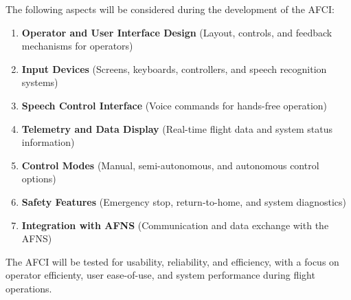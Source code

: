 \documentclass[12pt]{article}
\begin{document}
The following aspects will be considered during the development of the AFCI:
\begin{enumerate}
    \item \textbf{Operator and User Interface Design} (Layout, controls, and feedback mechanisms for operators)
    \item \textbf{Input Devices} (Screens, keyboards, controllers, and speech recognition systems)
    \item \textbf{Speech Control Interface} (Voice commands for hands-free operation)
    \item \textbf{Telemetry and Data Display} (Real-time flight data and system status information)
    \item \textbf{Control Modes} (Manual, semi-autonomous, and autonomous control options)
    \item \textbf{Safety Features} (Emergency stop, return-to-home, and system diagnostics)
    \item \textbf{Integration with AFNS} (Communication and data exchange with the AFNS)
\end{enumerate}

The AFCI will be tested for usability, reliability, and efficiency, with a focus on operator efficienty, user ease-of-use, and system performance during flight operations.
\end{document}
